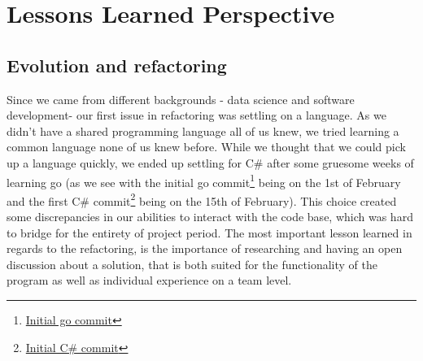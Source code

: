 \documentclass[report/main.tex]{subfiles}
\begin{document}
    \section{Lessons Learned Perspective}
    \label{sec:lessons_learned_persective}
        \subsection{Evolution and refactoring}
        \label{subsec:evolution-and-refactoring}
        
            Since we came from different backgrounds - data science and software development- our first issue in refactoring was settling on a language. As we didn't have a shared programming language all of us knew, we tried learning a common language none of us knew before. While we thought that we could pick up a language quickly, we ended up settling for C\# after some gruesome weeks of learning go (as we see with the initial go commit\footnote{\href{https://github.com/gustavjohansen98/E-vil-Corp/commit/495b59c65d4ba8814a76d4c42d495fc1f520a9b1}{Initial go commit}} being on the 1st of February and the first C\# commit\footnote{\href{https://github.com/gustavjohansen98/E-vil-Corp/commit/b51251470dd5c6347d1e354474b20cf5f382bb30}{Initial C\# commit}} being on the 15th of February). This choice created some discrepancies in our abilities to interact with the code base, which was hard to bridge for the entirety of project period. The most important lesson learned in regards to the refactoring, is the importance of researching and having an open discussion about a solution, that is both suited for the functionality of the program as well as individual experience on a team level.
    
            
\end{document}
